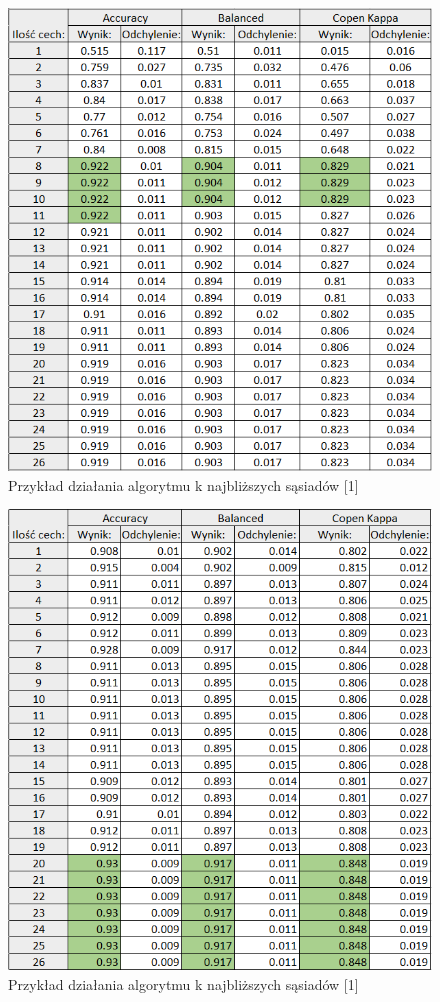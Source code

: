\documentclass[12pt]{article}
\begin{document}

\begin{figure}[H]
	\centering
		\includegraphics[scale=0.9]{images/metrics/9nn_euklides_norm_tab.png}
	\caption{Przykład działania algorytmu k najbliższych sąsiadów [1]}
\end{figure}
\begin{figure}[H]
	\centering
		\includegraphics[scale=0.9]{images/metrics/9nn_euklides_beznorm_tab.png}
	\caption{Przykład działania algorytmu k najbliższych sąsiadów [1]}
\end{figure}
\end{document}
